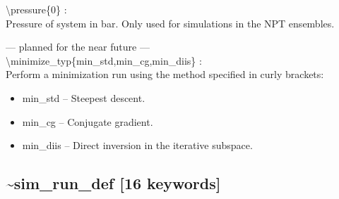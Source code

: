 \documentclass[12pt,titlepage]{article}
\begin{document}
\begin{enumerate}
 \vspace{0.15in} 
 \item   \textbackslash{}pressure\{0\} : \\
Pressure of system in bar. Only used for simulations in the NPT
ensembles.



 \vspace{0.15in} 
{\it

 \item  --- planned for the near future --- \\
 \textbackslash{}minimize\_typ\{min\_std,min\_cg,min\_diis\} : \\
     Perform a minimization run using the method specified in curly brackets:
     \begin{itemize}
        \item min\_std -- Steepest descent.
        \item min\_cg -- Conjugate gradient.
        \item min\_diis -- Direct inversion in the 
                                          iterative subspace.
     \end{itemize}
}

\end{enumerate}


\newpage
\subsection*{\bf \~{}sim\_run\_def [16 keywords]}
\end{document}
